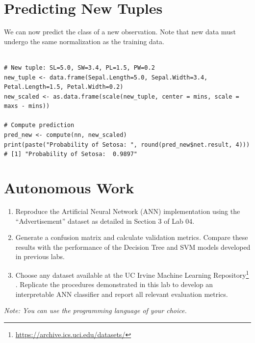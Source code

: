 \documentclass{article}
\begin{document}
\section{Predicting New Tuples}
We can now predict the class of a new observation. Note that new data must undergo the same normalization as the training data.

\begin{listing}[H]
    \begin{verbatim}

# New tuple: SL=5.0, SW=3.4, PL=1.5, PW=0.2
new_tuple <- data.frame(Sepal.Length=5.0, Sepal.Width=3.4, Petal.Length=1.5, Petal.Width=0.2)
new_scaled <- as.data.frame(scale(new_tuple, center = mins, scale = maxs - mins))

# Compute prediction
pred_new <- compute(nn, new_scaled)
print(paste("Probability of Setosa: ", round(pred_new$net.result, 4)))
# [1] "Probability of Setosa:  0.9897"

    \end{verbatim}
    \caption{Predictive inference for a new data observation. This final step scales a new data tuple and uses the trained network to compute the probability of it belonging to a specific class.}
\end{listing}

\section{Autonomous Work}

\begin{enumerate}

    \item Reproduce the Artificial Neural Network (ANN) implementation using the ``Advertisement'' dataset as detailed in Section 3 of Lab 04.

    \item Generate a confusion matrix and calculate validation metrics. Compare these results with the performance of the Decision Tree and SVM models developed in previous labs.

    \item Choose any dataset available at the UC Irvine Machine Learning Repository\footnote{\url{https://archive.ics.uci.edu/datasets/}} \parencite{Dua2019}. Replicate the procedures demonstrated in this lab to develop an interpretable ANN classifier and report all relevant evaluation metrics.

\end{enumerate}

\textit{Note: You can use the programming language of your choice.}

\printbibliography[title={References}]
\end{document}
